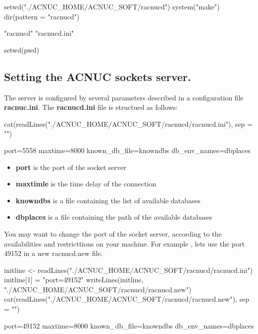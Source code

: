 \documentclass{article}
\begin{document}
\begin{Schunk}
\begin{Sinput}
 setwd("./ACNUC_HOME/ACNUC_SOFT/racnucd")
 system("make")
 dir(pattern = "racnucd")
\end{Sinput}
\begin{Soutput}
[1] "racnucd"     "racnucd.ini"
\end{Soutput}
\begin{Sinput}
 setwd(pwd)
\end{Sinput}
\end{Schunk}

\subsection{Setting the ACNUC sockets server.}

The server is configured by several parameters described in a configuration file \textbf{racnuc.ini}.
The \textbf{racnucd.ini} file is structued as follows:


\begin{Schunk}
\begin{Sinput}
 cat(readLines("./ACNUC_HOME/ACNUC_SOFT/racnucd/racnucd.ini"), 
     sep = "\n")
\end{Sinput}
\begin{Soutput}
port=5558
maxtime=8000
known_db_file=knowndbs
db_env_names=dbplaces
\end{Soutput}
\end{Schunk}

\begin{itemize}
\item \textbf{port} is the port of the socket server 
\item \textbf{maxtimle} is the time delay of the connection
\item \textbf{knowndbs} is a file containing the list of available databases
\item \textbf{dbplaces} is a file containing the path of the available databases
\end{itemize}



You may want to change the port of the socket server, according to the availabilities and restricttions on your machine.
For example , lets use the port 49152 in a new racnucd.new file.

\begin{Schunk}
\begin{Sinput}
 initline <- readLines("./ACNUC_HOME/ACNUC_SOFT/racnucd/racnucd.ini")
 initline[1] = "port=49152"
 writeLines(initline, "./ACNUC_HOME/ACNUC_SOFT/racnucd/racnucd.new")
 cat(readLines("./ACNUC_HOME/ACNUC_SOFT/racnucd/racnucd.new"), 
     sep = "\n")
\end{Sinput}
\begin{Soutput}
port=49152
maxtime=8000
known_db_file=knowndbs
db_env_names=dbplaces
\end{Soutput}
\end{Schunk}
\end{document}
